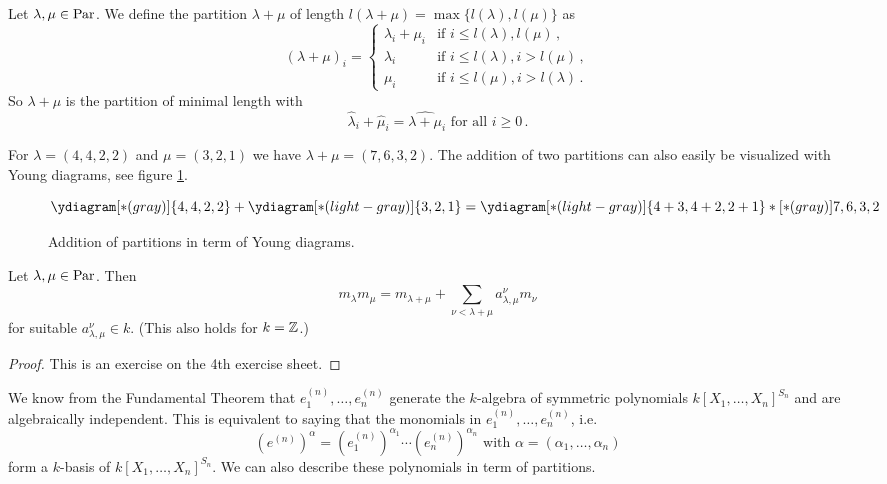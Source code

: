 \begin{defi}
  Let $\lambda, \mu \in \operatorname{Par}$.
  We define the partition $\lambda+\mu$ of length $l(\lambda+\mu) = \max\{ l(\lambda), l(\mu) \}$ as
  \[
      (\lambda+\mu)_i
    = \begin{cases}
        \lambda_i + \mu_i & \text{if } i \leq l(\lambda),l(\mu)       \,, \\
        \lambda_i         & \text{if } i \leq l(\lambda), i > l(\mu)  \,, \\
        \mu_i             & \text{if } i \leq l(\mu), i > l(\lambda)  \,.
      \end{cases}
  \]
  So $\lambda+\mu$ is the partition of minimal length with
  \[
      \hat{\lambda}_i + \hat{\mu}_i
    = \widehat{\lambda + \mu}_i
    \text{ for all }
    i \geq 0 \,.
  \]
\end{defi}


\begin{expl}
  For $\lambda = (4,4,2,2)$ and $\mu = (3,2,1)$ we have $\lambda + \mu = (7,6,3,2)$.
  The addition of two partitions can also easily be visualized with Young diagrams, see figure \ref{fig: addition partition young diagrams}.
  \begin{figure}\centering
    \[
        \ydiagram[*(gray)]{4,4,2,2} + \ydiagram[*(light-gray)]{3,2,1}
      = \ydiagram[*(light-gray)] {4+3,4+2,2+1} *[*(gray)]{7,6,3,2}
    \]
    \caption{Addition of partitions in term of Young diagrams.}
    \label{fig: addition partition young diagrams}
  \end{figure}
\end{expl}


\begin{lem}
  Let $\lambda, \mu \in \operatorname{Par}$.
  Then
  \[
      m_{\lambda} m_{\mu}
    =   m_{\lambda + \mu}
      + \sum_{\nu < \lambda + \mu} a^\nu_{\lambda,\mu} m_\nu
  \]
  for suitable $a^\nu_{\lambda,\mu} \in k$.
  (This also holds for $k = \mathbb{Z}$.)
\end{lem}
\begin{proof}
  This is an exercise on the 4th exercise sheet.
\end{proof}


We know from the Fundamental Theorem that $e^{(n)}_1, \dotsc, e^{(n)}_n$ generate the $k$-algebra of symmetric polynomials $k[X_1, \dotsc, X_n]^{S_n}$ and are algebraically independent. This is equivalent to saying that the monomials in $e^{(n)}_1, \dotsc, e^{(n)}_n$, i.e.\
\[
    \left( e^{(n)} \right)^\alpha
  = \left( e^{(n)}_1 \right)^{\alpha_1} \dotsm \left( e^{(n)}_n \right)^{\alpha_n}
  \text{ with }
  \alpha = (\alpha_1, \dotsc, \alpha_n)
\]
form a $k$-basis of $k[X_1, \dotsc, X_n]^{S_n}$.
We can also describe these polynomials in term of partitions.


